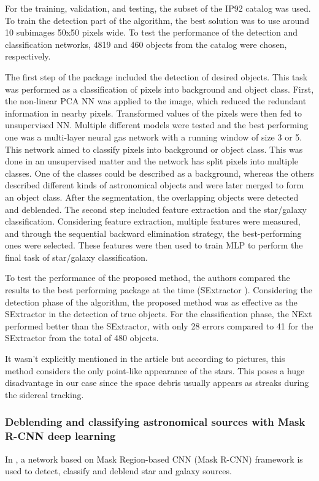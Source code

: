 For the training, validation, and testing, the subset of the IP92 catalog \cite{1992ApJS} was used. To train the detection part of the algorithm, the best solution was to use around 10 subimages 50x50 pixels wide. To test the performance of the detection and classification networks, 4819 and 460 objects from the catalog were chosen, respectively.

The first step of the package included the detection of desired objects. This task was performed as a classification of pixels into background and object class. First, the non-linear PCA NN was applied to the image, which reduced the redundant information in nearby pixels. Transformed values of the pixels were then fed to unsupervised NN. Multiple different models were tested and the best performing one was a multi-layer neural gas network with a running window of size 3 or 5. 
This network aimed to classify pixels into background or object class. This was done in an unsupervised matter and the network has split pixels into multiple classes. One of the classes could be described as a background, whereas the others described different kinds of astronomical objects and were later merged to form an object class. After the segmentation, the overlapping objects were detected and deblended.
The second step included feature extraction and the star/galaxy classification. Considering feature extraction, multiple features were measured, and through the sequential backward elimination strategy, the best-performing ones were selected. These features were then used to train MLP to perform the final task of star/galaxy classification. 

To test the performance of the proposed method, the authors compared the results to the best performing package at the time (SExtractor \cite{sextractor}). Considering the detection phase of the algorithm, the proposed method was as effective as the SExtractor in the detection of true objects. For the classification phase, the NExt performed better than the SExtractor, with only 28 errors compared to 41 for the SExtractor from the total of 480 objects. 

It wasn't explicitly mentioned in the article but according to pictures, this method considers the only point-like appearance of the stars. This poses a huge disadvantage in our case since the space debris usually appears as streaks during the sidereal tracking.  



\subsubsection{Deblending and classifying astronomical sources with Mask R-CNN deep learning}
In \cite{Burke2019}, a network based on Mask Region-based CNN (Mask R-CNN) framework is used to detect, classify and deblend star and galaxy sources. 

